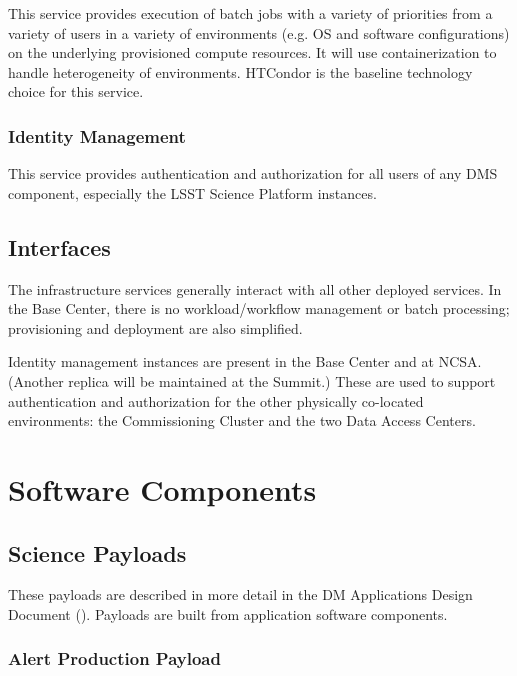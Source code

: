 \documentclass[DM,toc]{lsstdoc}
\begin{document}
This service provides execution of batch jobs with a variety of
priorities from a variety of users in a variety of environments (e.g. OS
and software configurations) on the underlying provisioned compute
resources. It will use containerization to handle heterogeneity of
environments. HTCondor is the baseline technology choice for this
service.

\subsubsection{Identity Management}\label{identity-management}

This service provides authentication and authorization for all users of
any DMS component, especially the LSST Science Platform instances.

\subsection{Interfaces}\label{infrastructure-interfaces}

The infrastructure services generally interact with all other deployed
services.  In the Base Center, there is no workload/workflow management or
batch processing; provisioning and deployment are also simplified.

Identity management instances are present in the Base Center and at NCSA.
(Another replica will be maintained at the Summit.)  These are used to support
authentication and authorization for the other physically co-located environments:
the Commissioning Cluster and the two Data Access Centers.


\section{Software Components}\label{software-components}

\subsection{Science Payloads}\label{science-payloads}

These payloads are described in more detail in the DM Applications Design
Document (). Payloads are built from application software
components.

\subsubsection{Alert Production Payload}\label{alert-production-payload}
\end{document}
